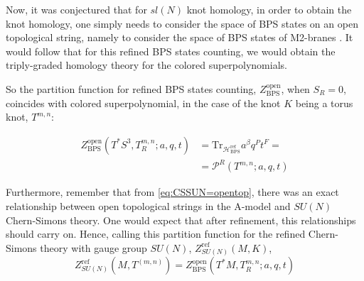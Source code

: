 \documentclass[a4paper,titlepage,twoside]{book}
\begin{document}

Now, it was conjectured that for $sl{(N)}$ knot homology, in order to obtain the knot homology, one simply needs to consider the space of BPS states on an open topological string, namely to consider the space of BPS states of M2-branes \cite{GukovSchwarzVafa2005}.  It would follow that for this refined BPS states counting, we would obtain the triply-graded homology theory for the colored superpolynomials.  

So the partition function for refined BPS states counting, $Z^{\text{open}}_{ \text{BPS}}$, when $S_R=0$,  coincides with colored superpolynomial, in the case of the knot $K$ being a torus knot, $T^{m,n}$:  

\begin{equation}
\begin{aligned}
   Z^{ \text{open}}_{\text{BPS}}{ (T^*S^3, T^{ m,n }_R ; a,q,t) }    & = \text{Tr}_{ \mathcal{H}^{ \text{ref}}_{ \text{BPS}}  }{ a^{ \beta} q^P t^F } =  \\
 &  = \mathcal{P}^R{ (T^{m,n};a,q,t) }
\end{aligned}
\end{equation}


Furthermore, remember that from \eqref{eq:CSSUN=opentop}, there was an exact relationship between open topological strings in the A-model and $SU(N)$ Chern-Simons theory.  One would expect that after refinement, this relationships should carry on.  Hence, calling this partition function for the refined Chern-Simons theory with gauge group $SU(N)$, $Z^{\text{ref}}_{SU(N)}{(M,K)}$, 
\begin{equation}
  Z^{\text{ref}}_{SU(N)}{(M, T^{(m,n)}) } = Z^{\text{open}}_{\text{BPS}}{ (T^*M, T^{m,n}_R;a,q,t)}
\end{equation}
\end{document}
